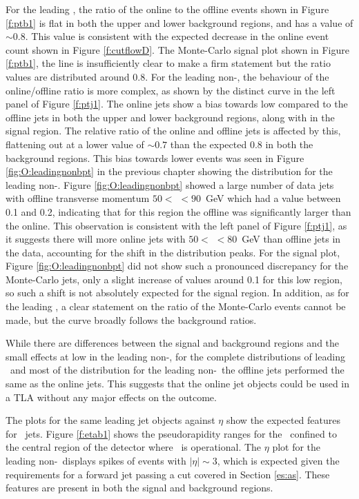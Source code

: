     For the leading \bjet, the ratio of the online to the offline events shown in Figure \ref{f:ptb1} is flat in both the upper and lower background regions, and has a value of $\sim0.8$. This value is consistent with the expected decrease in the online event count shown in Figure \ref{f:cutflowD}. The Monte-Carlo signal plot shown in Figure \ref{f:ptb1}, the line is insufficiently clear to make a firm statement but the ratio values are distributed around $0.8$. For the leading non-\bjet, the behaviour of the online/offline ratio is more complex, as shown by the distinct curve in the left panel of Figure \ref{f:ptj1}. The online jets show a bias towards low \pt compared to the offline jets in both the upper and lower background regions, along with in the signal region. The relative ratio of the online and offline jets is affected by this, flattening out at a lower value of $\sim0.7$ than the expected $0.8$ in both the background regions. This bias towards lower \pt events was seen in Figure \ref{fig:O:leadingnonbpt} in the previous chapter showing the \dptpt distribution for the leading non-\bjet. Figure \ref{fig:O:leadingnonbpt} showed a large number of data jets with offline transverse momentum $50<$ \pt$<90$~GeV which had a \dptpt value between 0.1 and 0.2, indicating that for this region the offline \pt was significantly larger than the online. This observation is consistent with the left panel of Figure \ref{f:ptj1}, as it suggests there will more online jets with $50<$ \pt$<80$~GeV than offline jets in the data, accounting for the shift in the distribution peaks. For the signal plot, Figure \ref{fig:O:leadingnonbpt} did not show such a pronounced discrepancy for the Monte-Carlo jets, only a slight increase of \dptpt values around 0.1 for this low \pt region, so such a shift is not absolutely expected for the signal region. In addition, as for the leading \bjet, a clear statement on the ratio of the Monte-Carlo events cannot be made, but the curve broadly follows the background ratios.

    While there are differences between the signal and background regions and the small effects at low \pt in the leading non-\bjets, for the complete \pt distributions of leading \bjet\ and most of the distribution for the leading non-\bjet\, the offline jets performed the same as the online jets. This suggests that the online jet objects could be used in a TLA without any major effects on the outcome.

    The plots for the same leading jet objects against $\eta$ show the expected features for \VBFHBB\ jets. Figure \ref{f:etab1} shows the pseudorapidity ranges for the \bjet\ confined to the central region of the detector where \btag\ is operational. The $\eta$ plot for the leading non-\bjet\ displays spikes of events with $|\eta|\sim3$, which is expected given the requirements for a forward jet passing a \pt cut covered in Section \ref{es:as}. These features are present in both the signal and background regions.

